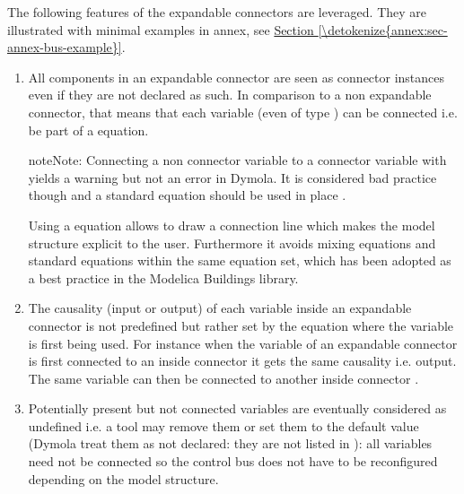 \documentclass[letterpaper,10pt, openany,english]{sphinxmanual}
\begin{document}
The following features of the expandable connectors are leveraged. They are illustrated with minimal examples in annex, see \hyperref[\detokenize{annex:sec-annex-bus-example}]{Section \ref{\detokenize{annex:sec-annex-bus-example}}}.
\begin{enumerate}
%
\item {} 
All components in an expandable connector are seen as connector instances even if they are not declared as such. In comparison to a non expandable connector, that means that each variable (even of type ) can be connected i.e. be part of a  equation.

\begin{sphinxadmonition}{note}{Note:}
Connecting a non connector variable to a connector variable with  yields a warning but not an error in Dymola. It is considered bad practice though and a standard equation should be used in place .

Using a  equation allows to draw a connection line which makes the model structure explicit to the user. Furthermore it avoids mixing  equations and standard equations within the same equation set, which has been adopted as a best practice in the Modelica Buildings library.
\end{sphinxadmonition}

\item {} 
The causality (input or output) of each variable inside an expandable connector is not predefined but rather set by the  equation where the variable is first being used. For instance when the variable of an expandable connector is first connected to an inside connector  it gets the same causality i.e. output. The same variable can then be connected to another inside connector  .

\item {} 
Potentially present but not connected variables are eventually considered as undefined i.e. a tool may remove them or set them to the default value (Dymola treat them as not declared: they are not listed in ): all variables need not be connected so the control bus does not have to be reconfigured depending on the model structure.


\end{enumerate}
\end{document}
